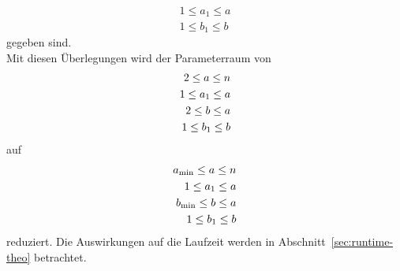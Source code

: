 \begin{align*}
		1\leq a_1\leq a \\
		1\leq b_1\leq b
\end{align*}
gegeben sind.\\
Mit diesen Überlegungen wird der Parameterraum von
\begin{align}
		2 \leq a \leq n \notag \\
		1 \leq a_1 \leq a \notag \\
		2 \leq b \leq a \notag \\
		1 \leq b_1 \leq b \label{eq:parameterspace1}
\end{align}
auf
\begin{align}
		a_\mathrm{min} \leq a \leq n \notag \\
		1 \leq a_1 \leq a \notag \\
		b_\mathrm{min} \leq b \leq a \notag \\
		1 \leq b_1 \leq b \label{eq:parameterspace2}
\end{align}
reduziert. Die Auswirkungen auf die Laufzeit werden in Abschnitt~\ref{sec:runtime-theo} betrachtet.

